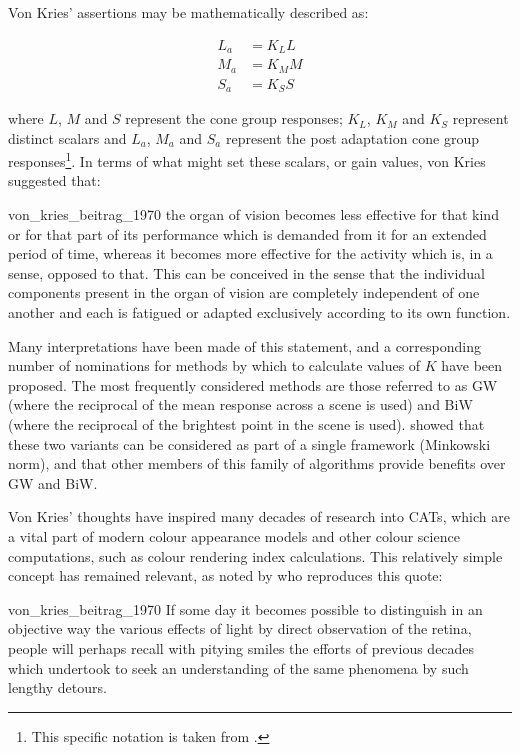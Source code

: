 Von Kries' assertions may be mathematically described as:

\begin{subequations}
\begin{align}
L_{a}&=K_{L}L \\
M_{a}&=K_{M}M \\
S_{a}&=K_{S}S
\end{align}
\end{subequations}

where $L$, $M$ and $S$ represent the cone group responses; $K_{L}$, $K_{M}$ and $K_{S}$ represent distinct scalars and $L_{a}$, $M_{a}$ and $S_{a}$ represent the post adaptation cone group responses\footnote{This specific notation is taken from \citet[p. 183]{fairchild_color_2013}.}. In terms of what might set these scalars, or gain values, von Kries suggested that: 

\begin{itquote}{von_kries_beitrag_1970}
the organ of vision becomes less effective for that kind or for that part of its performance which is demanded from it for an extended period of time, whereas it becomes more effective for the activity which is, in a sense, opposed to that. This can be conceived in the sense that the individual components present in the organ of vision are completely independent of one another and each is fatigued or adapted exclusively according to its own function.
\end{itquote}

Many interpretations have been made of this statement, and a corresponding number of nominations for methods by which to calculate values of $K$ have been proposed. The most frequently considered methods are those referred to as \acrfull{GW} (where the reciprocal of the mean response across a scene is used) and \acrfull{BiW} (where the reciprocal of the brightest point in the scene is used). \citet{finlayson_shades_2004} showed that these two variants can be considered as part of a single framework (Minkowski norm), and that other members of this family of algorithms provide benefits over \gls{GW} and \gls{BiW}.

Von Kries' thoughts have inspired many decades of research into \glspl{CAT}, which are a vital part of modern colour appearance models and other colour science computations, such as colour rendering index calculations. This relatively simple concept has remained relevant, as noted by \citet[p. 182]{fairchild_color_2013} who reproduces this quote:

\begin{citequote}{von_kries_beitrag_1970}
If some day it becomes possible to distinguish in an objective way the
various effects of light by direct observation of the retina, people will perhaps
recall with pitying smiles the efforts of previous decades which
undertook to seek an understanding of the same phenomena by such
lengthy detours.
\end{citequote}


